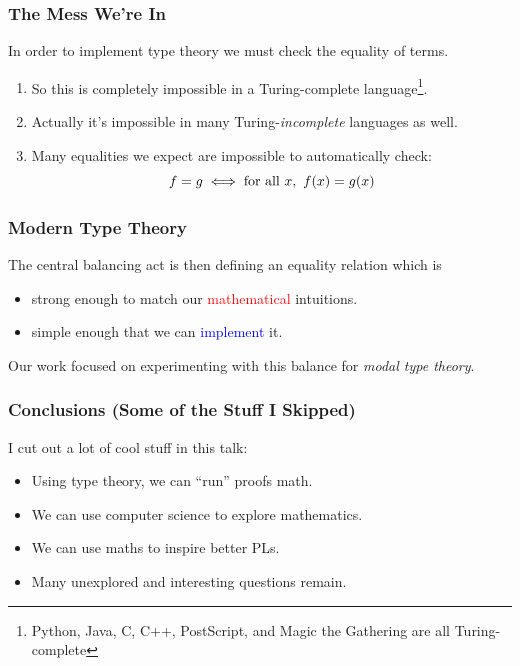 \documentclass[usenames,dvipsnames,aspectratio=169,12pt]{beamer}
\begin{document}
\begin{frame}
  \frametitle{The Mess We're In}
  In order to implement type theory we must check the equality of terms.
  \begin{enumerate}
  \item So this is completely impossible in a Turing-complete language\footnote{Python, Java, C,
      C++, PostScript, and Magic the Gathering are all Turing-complete}.
  \item Actually it's impossible in many Turing-\emph{incomplete} languages as well.
  \item Many equalities we expect are impossible to automatically check:
    \[
      f = g \iff \text{for all } x,\ f(x) = g(x)
    \]
  \end{enumerate}
\end{frame}

\begin{frame}
  \frametitle{Modern Type Theory}
  The central balancing act is then defining an equality relation which is
  \begin{itemize}
  \item strong enough to match our \textcolor{Red}{mathematical} intuitions.
  \item simple enough that we can \textcolor{Blue}{implement} it.
  \end{itemize}
  \bigskip

  Our work focused on experimenting with this balance for \emph{modal type theory}.
\end{frame}



\begin{frame}
  \frametitle{Conclusions (Some of the Stuff I Skipped)}
  I cut out a lot of cool stuff in this talk:
  \begin{itemize}
  \item Using type theory, we can ``run'' proofs math.
  \item We can use computer science to explore mathematics.
  \item We can use maths to inspire better PLs.
  \item Many unexplored and interesting questions remain.
  \end{itemize}
\end{frame}
\end{document}
